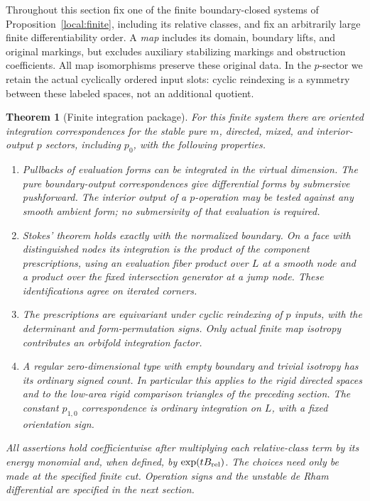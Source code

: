 \documentclass[11pt]{article}
\newtheorem{theorem}{Theorem}[section]
\theoremstyle{definition}
\theoremstyle{remark}
\numberwithin{equation}{section}
\begin{document}
Throughout this section fix one of the finite boundary-closed systems of
Proposition~\ref{local:finite}, including its relative classes, and fix an
arbitrarily large finite differentiability order.  A \emph{map} includes
its domain, boundary lifts, and original markings, but excludes auxiliary
stabilizing markings and obstruction coefficients.  All map isomorphisms
preserve these original data.  In the $p$-sector we retain the actual
cyclically ordered input slots: cyclic reindexing is a symmetry between
these labeled spaces, not an additional quotient.

\begin{theorem}[Finite integration package]\label{virt:finite-integration}
For this finite system there are oriented integration correspondences for
the stable pure $m$, directed, mixed, and interior-output $p$ sectors,
including $p_0$, with the following properties.
\begin{enumerate}[label=\textup{(\roman*)}]
\item Pullbacks of evaluation forms can be integrated in the virtual
dimension.  The pure boundary-output correspondences give differential
forms by submersive pushforward.  The interior output of a $p$-operation
may be tested against any smooth ambient form; no submersivity of that
evaluation is required.
\item Stokes' theorem holds exactly with the normalized boundary.  On a
face with distinguished nodes its integration is the product of the
component prescriptions, using an evaluation fiber product over $L$ at
a smooth node and a product over the fixed intersection generator at a
jump node.  These identifications agree on iterated corners.
\item The prescriptions are equivariant under cyclic reindexing of $p$
inputs, with the determinant and form-permutation signs.  Only actual
finite map isotropy contributes an orbifold integration factor.
\item A regular zero-dimensional type with empty boundary and trivial
isotropy has its ordinary signed count.  In particular this applies to
the rigid directed spaces and to the low-area rigid comparison triangles
of the preceding section.  The constant $p_{1,0}$ correspondence is
ordinary integration on $L$, with a fixed orientation sign.
\end{enumerate}
All assertions hold coefficientwise after multiplying each relative-class
term by its energy monomial and, when defined, by
$\exp(tB_{\rm rel})$.  The choices need only be made at the specified
finite cut.  Operation signs and the unstable de Rham differential are
specified in the next section.
\end{theorem}
\end{document}
